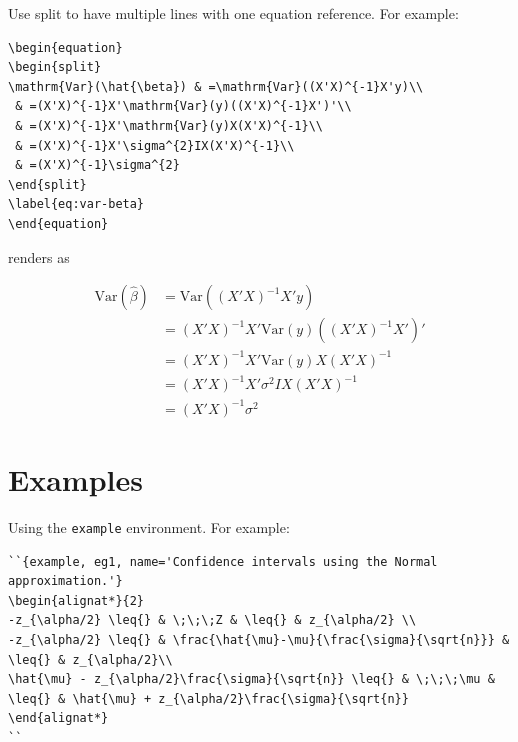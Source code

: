 \documentclass[
  oneside]{krantz}
\theoremstyle{definition}
\theoremstyle{definition}
\theoremstyle{definition}
\theoremstyle{remark}
\begin{document}
Use split to have multiple lines with one equation reference. For example:

\begin{verbatim}
\begin{equation} 
\begin{split}
\mathrm{Var}(\hat{\beta}) & =\mathrm{Var}((X'X)^{-1}X'y)\\
 & =(X'X)^{-1}X'\mathrm{Var}(y)((X'X)^{-1}X')'\\
 & =(X'X)^{-1}X'\mathrm{Var}(y)X(X'X)^{-1}\\
 & =(X'X)^{-1}X'\sigma^{2}IX(X'X)^{-1}\\
 & =(X'X)^{-1}\sigma^{2}
\end{split}
\label{eq:var-beta}
\end{equation} 
\end{verbatim}

renders as

\begin{equation} 
\begin{split}
\mathrm{Var}(\hat{\beta}) & =\mathrm{Var}((X'X)^{-1}X'y)\\
 & =(X'X)^{-1}X'\mathrm{Var}(y)((X'X)^{-1}X')'\\
 & =(X'X)^{-1}X'\mathrm{Var}(y)X(X'X)^{-1}\\
 & =(X'X)^{-1}X'\sigma^{2}IX(X'X)^{-1}\\
 & =(X'X)^{-1}\sigma^{2}
\end{split}
\label{eq:var-beta}
\end{equation}

\hypertarget{examples}{%
\section{Examples}\label{examples}}

Using the \texttt{example} environment. For example: 

\begin{verbatim}
``{example, eg1, name='Confidence intervals using the Normal approximation.'}
\begin{alignat*}{2}
-z_{\alpha/2} \leq{} & \;\;\;Z & \leq{} & z_{\alpha/2} \\
-z_{\alpha/2} \leq{} & \frac{\hat{\mu}-\mu}{\frac{\sigma}{\sqrt{n}}} & \leq{} & z_{\alpha/2}\\
\hat{\mu} - z_{\alpha/2}\frac{\sigma}{\sqrt{n}} \leq{} & \;\;\;\mu & \leq{} & \hat{\mu} + z_{\alpha/2}\frac{\sigma}{\sqrt{n}}
\end{alignat*}
``
\end{verbatim}
\end{document}

